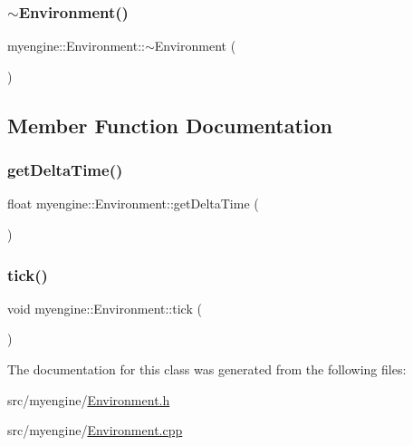 \subsubsection{\texorpdfstring{$\sim$\+Environment()}{~Environment()}}
{\footnotesize\ttfamily myengine\+::\+Environment\+::$\sim$\+Environment (\begin{DoxyParamCaption}{ }\end{DoxyParamCaption})}



\subsection{Member Function Documentation}
\mbox{\label{classmyengine_1_1_environment_aa1f6d8ffc9d9cce24c9fd6b86445ccbc}} 
\subsubsection{\texorpdfstring{get\+Delta\+Time()}{getDeltaTime()}}
{\footnotesize\ttfamily float myengine\+::\+Environment\+::get\+Delta\+Time (\begin{DoxyParamCaption}{ }\end{DoxyParamCaption})}

\mbox{\label{classmyengine_1_1_environment_a899c1088832b702e5c4e7d309a68e8fb}} 
\subsubsection{\texorpdfstring{tick()}{tick()}}
{\footnotesize\ttfamily void myengine\+::\+Environment\+::tick (\begin{DoxyParamCaption}{ }\end{DoxyParamCaption})}



The documentation for this class was generated from the following files\+:\begin{DoxyCompactItemize}
\item 
src/myengine/\hyperlink{_environment_8h}{Environment.\+h}\item 
src/myengine/\hyperlink{_environment_8cpp}{Environment.\+cpp}\end{DoxyCompactItemize}
